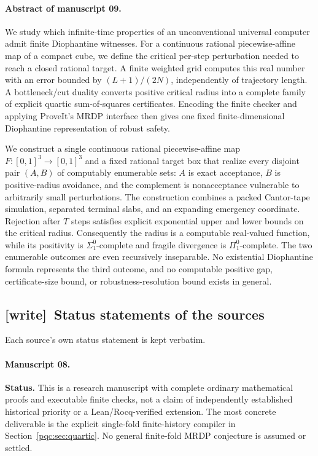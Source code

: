 \documentclass[11pt,letterpaper]{article}
\numberwithin{equation}{section}
\theoremstyle{definition}
\theoremstyle{remark}
\newcommand{\wtag}{\textup{[write]}}
\newcommand{\cenum}{computably enumerable}
\newcommand{\PWA}{piecewise-affine}
\begin{document}
\paragraph{Abstract of manuscript 09.}
We study which infinite-time properties of an unconventional universal computer
admit finite Diophantine witnesses.  For a continuous rational \PWA{} map of a
compact cube, we define the critical per-step perturbation needed to reach a
closed rational target.  A finite weighted grid computes this real number with
an error bounded by $(L+1)/(2N)$, independently of trajectory length.  A
bottleneck/cut duality converts positive critical radius into a complete family
of explicit quartic sum-of-squares certificates.  Encoding the finite checker
and applying ProveIt's MRDP interface then gives one fixed finite-dimensional
Diophantine representation of robust safety.

We construct a single continuous rational \PWA{} map $F:[0,1]^3\to[0,1]^3$
and a fixed rational target box that realize every disjoint pair $(A,B)$ of
\cenum{} sets: $A$ is exact acceptance, $B$ is positive-radius avoidance, and the
complement is nonacceptance vulnerable to arbitrarily small perturbations.
The construction combines a packed Cantor-tape simulation, separated terminal
slabs, and an expanding emergency coordinate.  Rejection after $T$ steps
satisfies explicit exponential upper and lower bounds on the critical radius.
Consequently the radius is a computable real-valued function, while its
positivity is $\Sigma^0_1$-complete and fragile divergence is $\Pi^0_1$-complete.
The two enumerable outcomes are even recursively inseparable.  No existential
Diophantine formula represents the third outcome, and no computable positive
gap, certificate-size bound, or robustness-resolution bound exists in general.

\subsection{\wtag\ Status statements of the sources}
\label{pqc:conv:status}
Each source's own status statement is kept verbatim.

\paragraph{Manuscript 08.}
\textbf{Status.} This is a research manuscript with complete ordinary
mathematical proofs and executable finite checks, not a claim of independently
established historical priority or a Lean/Rocq-verified extension. The most
concrete deliverable is the explicit single-fold finite-history compiler in
Section~\ref{pqc:sec:quartic}. No general finite-fold MRDP conjecture is assumed or
settled.
\end{document}
